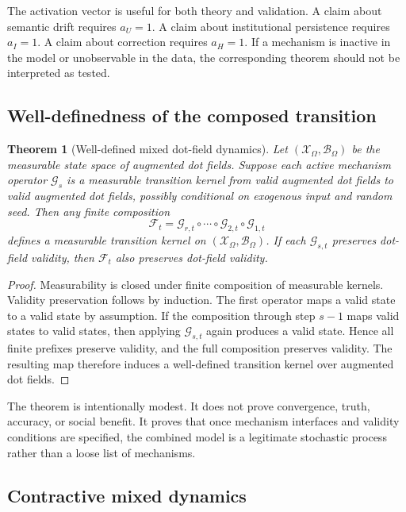 \documentclass[11pt]{article}
\newtheorem{theorem}{Theorem}
\theoremstyle{remark}
\begin{document}
The activation vector is useful for both theory and validation. A claim about semantic drift requires \(a_U=1\). A claim about institutional persistence requires \(a_I=1\). A claim about correction requires \(a_H=1\). If a mechanism is inactive in the model or unobservable in the data, the corresponding theorem should not be interpreted as tested.

\subsection{Well-definedness of the composed transition}\label{well-defined-composed-transition}

\begin{theorem}[Well-defined mixed dot-field dynamics]\label{thm:well-defined-mixed-dot-field-dynamics}
Let \((\mathcal X_\Omega,\mathcal B_\Omega)\) be the measurable state space of augmented dot fields. Suppose each active mechanism operator \(\mathscr G_s\) is a measurable transition kernel from valid augmented dot fields to valid augmented dot fields, possibly conditional on exogenous input and random seed. Then any finite composition
\[
\mathscr F_t=\mathscr G_{r,t}\circ\cdots\circ\mathscr G_{2,t}\circ\mathscr G_{1,t}
\]
defines a measurable transition kernel on \((\mathcal X_\Omega,\mathcal B_\Omega)\). If each \(\mathscr G_{s,t}\) preserves dot-field validity, then \(\mathscr F_t\) also preserves dot-field validity.
\end{theorem}

\begin{proof}
Measurability is closed under finite composition of measurable kernels. Validity preservation follows by induction. The first operator maps a valid state to a valid state by assumption. If the composition through step \(s-1\) maps valid states to valid states, then applying \(\mathscr G_{s,t}\) again produces a valid state. Hence all finite prefixes preserve validity, and the full composition preserves validity. The resulting map therefore induces a well-defined transition kernel over augmented dot fields.
\end{proof}

The theorem is intentionally modest. It does not prove convergence, truth, accuracy, or social benefit. It proves that once mechanism interfaces and validity conditions are specified, the combined model is a legitimate stochastic process rather than a loose list of mechanisms.

\subsection{Contractive mixed dynamics}\label{contractive-mixed-dynamics}
\end{document}
